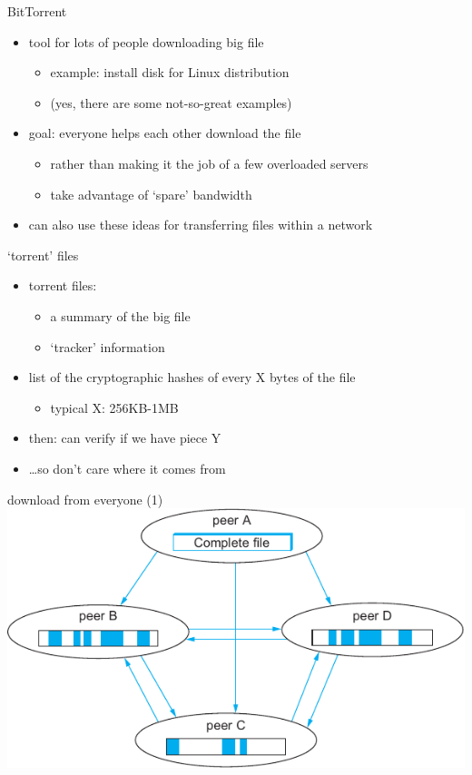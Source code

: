 \begin{frame}{BitTorrent}
    \begin{itemize}
    \item tool for lots of people downloading big file
        \begin{itemize}
        \item example: install disk for Linux distribution
        \item (yes, there are some not-so-great examples)
        \end{itemize}
    \item goal: everyone helps each other download the file
        \begin{itemize}
        \item rather than making it the job of a few overloaded servers
        \item take advantage of `spare' bandwidth
        \end{itemize}
    \item can also use these ideas for transferring files within a network
    \end{itemize}
\end{frame}

\begin{frame}{`torrent' files}
    \begin{itemize}
    \item torrent files:
        \begin{itemize}
        \item a summary of the big file
        \item `tracker' information
        \end{itemize}
    \item list of the cryptographic hashes of every X bytes of the file
        \begin{itemize}
        \item typical X: 256KB-1MB
        \end{itemize}
    \vspace{.5cm}
    \item then: can verify if we have piece Y
    \item \ldots so don't care where it comes from
    \end{itemize}
\end{frame}

\begin{frame}{download from everyone (1)}
\includegraphics[height=0.9\textheight]{sysapp-bittorrent.pdf}
\end{frame}

